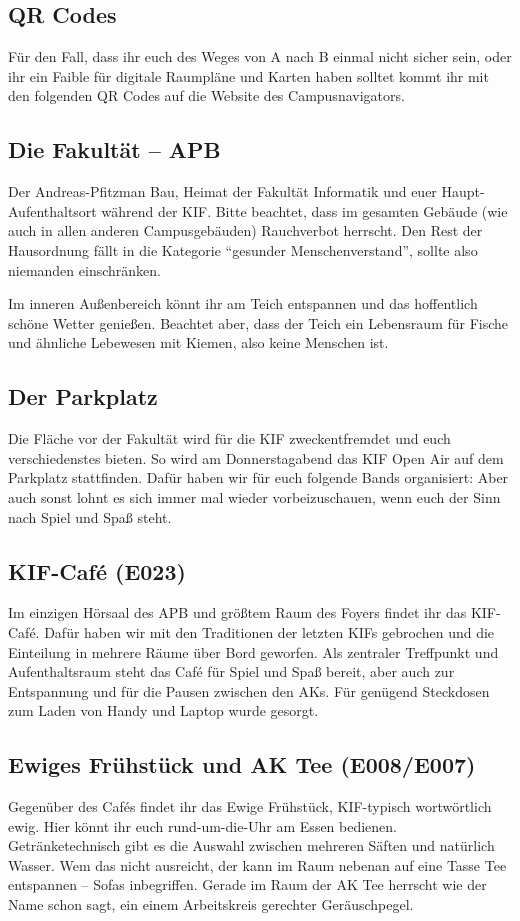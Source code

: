 
\subsection*{QR Codes}
Für den Fall, dass ihr euch des Weges von A nach B einmal nicht sicher sein, oder ihr ein Faible für digitale Raumpläne und Karten haben solltet kommt ihr mit den folgenden QR Codes auf die Website des Campusnavigators.

\subsection*{Die Fakultät -- APB}
Der Andreas-Pfitzman Bau, Heimat der Fakultät Informatik und euer Haupt-Aufenthaltsort während der KIF\@.
Bitte beachtet, dass im gesamten Gebäude (wie auch in allen anderen Campusgebäuden) Rauchverbot herrscht.
Den Rest der Hausordnung fällt in die Kategorie \enquote{gesunder Menschenverstand}, sollte also niemanden einschränken.

Im inneren Außenbereich könnt ihr am Teich entspannen und das hoffentlich schöne Wetter genießen.
Beachtet aber, dass der Teich ein Lebensraum für Fische und ähnliche Lebewesen mit Kiemen, also keine Menschen ist.

\subsection*{Der Parkplatz}
Die Fläche vor der  Fakultät wird für die KIF zweckentfremdet und euch verschiedenstes bieten.  So wird am Donnerstagabend das KIF Open Air auf dem Parkplatz stattfinden. Dafür haben wir für euch folgende Bands organisiert:
Aber auch sonst lohnt es sich immer mal wieder vorbeizuschauen, wenn euch der Sinn nach Spiel und Spaß steht.

\subsection*{KIF-Café (E023)}
Im einzigen Hörsaal des APB und größtem Raum des Foyers findet ihr das KIF-Café.
Dafür haben wir mit den Traditionen der letzten KIFs gebrochen und die Einteilung in mehrere Räume über Bord geworfen.
Als zentraler Treffpunkt und Aufenthaltsraum steht das Café für Spiel und Spaß bereit, aber auch zur Entspannung und für die Pausen zwischen den AKs.
Für genügend Steckdosen zum Laden von Handy und Laptop wurde gesorgt.

\subsection*{Ewiges Frühstück und AK Tee (E008/E007)}
Gegenüber des Cafés findet ihr das Ewige Frühstück, KIF-typisch wortwörtlich ewig.
Hier könnt ihr euch rund-um-die-Uhr am Essen bedienen.
Getränketechnisch gibt es die Auswahl zwischen mehreren Säften und natürlich Wasser.
Wem das nicht ausreicht, der kann im Raum nebenan auf eine Tasse Tee entspannen -- Sofas inbegriffen.
Gerade im Raum der AK Tee herrscht wie der Name schon sagt, ein einem Arbeitskreis gerechter Geräuschpegel.

